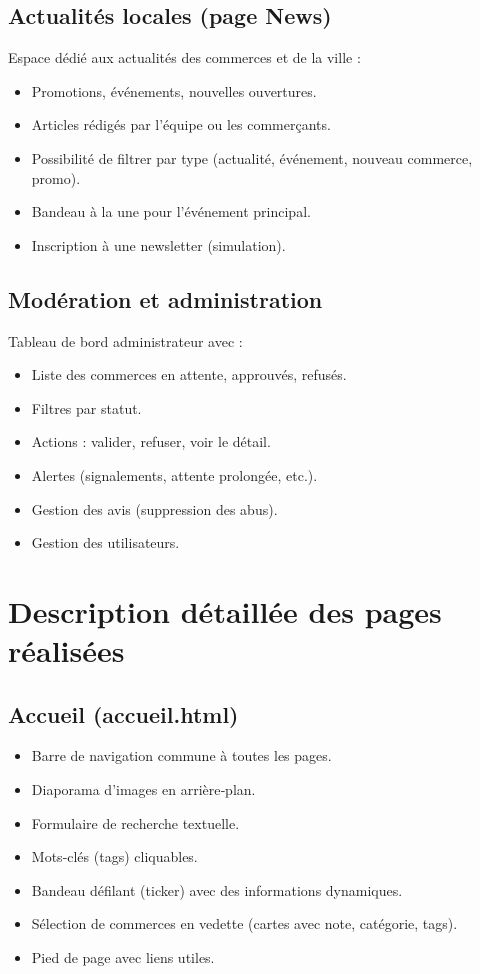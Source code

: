 \documentclass[a4paper,12pt]{article}
\begin{document}
\subsection{Actualités locales (page News)}
Espace dédié aux actualités des commerces et de la ville :
\begin{itemize}
    \item Promotions, événements, nouvelles ouvertures.
    \item Articles rédigés par l’équipe ou les commerçants.
    \item Possibilité de filtrer par type (actualité, événement, nouveau commerce, promo).
    \item Bandeau à la une pour l’événement principal.
    \item Inscription à une newsletter (simulation).
\end{itemize}

\subsection{Modération et administration}
Tableau de bord administrateur avec :
\begin{itemize}
    \item Liste des commerces en attente, approuvés, refusés.
    \item Filtres par statut.
    \item Actions : valider, refuser, voir le détail.
    \item Alertes (signalements, attente prolongée, etc.).
    \item Gestion des avis (suppression des abus).
    \item Gestion des utilisateurs.
\end{itemize}

\section{Description détaillée des pages réalisées}
\subsection{Accueil (accueil.html)}
\begin{itemize}
    \item Barre de navigation commune à toutes les pages.
    \item Diaporama d’images en arrière‑plan.
    \item Formulaire de recherche textuelle.
    \item Mots‑clés (tags) cliquables.
    \item Bandeau défilant (ticker) avec des informations dynamiques.
    \item Sélection de commerces en vedette (cartes avec note, catégorie, tags).
    \item Pied de page avec liens utiles.
\end{itemize}
\end{document}
